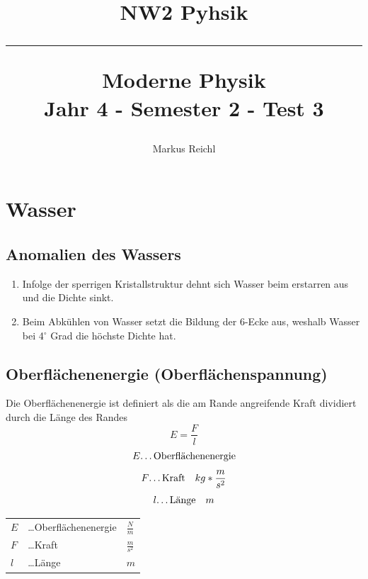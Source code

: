 \documentclass[a4paper,11pt]{article}
\title{
    \begin{center}
        \Large{NW2 Pyhsik}\\
        \rule{0.5\textwidth}{0.1 mm}
    \end{center}
    \vspace{1 em}
    \huge{Moderne Physik} \vspace{0.5 em} \\
    \large{Jahr 4 \-- Semester 2 \-- Test 3} \vspace{1.5 em}
}
\author{Markus Reichl}
\begin{document}
\maketitle
\tableofcontents

\newpage
\section{Wasser}
\subsection{Anomalien des Wassers}
\begin{enumerate}
    \item Infolge der sperrigen Kristallstruktur dehnt sich Wasser beim erstarren aus und die Dichte sinkt.
    \item Beim Abkühlen von Wasser setzt die Bildung der 6-Ecke aus, weshalb Wasser bei 4$^\circ$ Grad die höchste Dichte hat.
\end{enumerate}

\subsection{Oberflächenenergie (Oberflächenspannung)}
Die Oberflächenenergie ist definiert als die am Rande angreifende Kraft dividiert durch die Länge des Randes
$$E = \frac{F}{l}$$
$$E \text{\dots Oberflächenenergie}$$
$$F \text{\dots Kraft}\quad kg * \frac{m}{s^2}$$
$$l \text{\dots Länge}\quad m$$
\begin{center}
    \begin{tabular}{l l l}
        $E$ &\dots Oberflächenenergie & $\frac{N}{m}$\\
        $F$ &\dots Kraft & $\frac{m}{s^2}$\\
        $l$ &\dots Länge & $m$\\
    \end{tabular}
\end{center}
\end{document}
